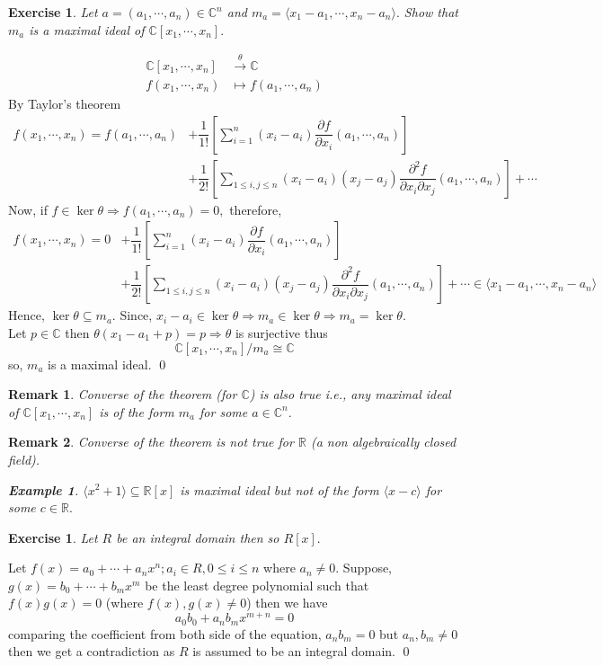 \documentclass[11pt]{amsart}
\newtheorem{ex}[theorem]{Exercise}
\newtheorem*{eg*}{Example}
\newtheorem*{remark*}{Remark}
\newcommand{\CC}{\mathbb C}
\newcommand{\RR}{\mathbb R}
\newcommand{\gen}[1]{\langle#1\rangle}
\begin{document}
\begin{ex}
Let $a=(a_1,\cdots ,a_n)\in {\CC}^n$ and $m_a=\langle x_1-a_1,\cdots ,x_n-a_n\rangle.$ Show that $m_a$ is a maximal ideal of ${\CC}[x_1,\cdots ,x_n].$
\end{ex}
\proof \begin{align*}
{\CC}[x_1,\cdots ,x_n]&\stackrel{\theta}{\longrightarrow} {\CC}\\
f(x_1,\cdots ,x_n)&\mapsto f(a_1,\cdots ,a_n)
\end{align*}
By Taylor's theorem \begin{align*}
f(x_1,\cdots ,x_n)=f(a_1,\cdots ,a_n)&+\dfrac{1}{1!}\left[\displaystyle\sum_{i=1}^n (x_i-a_i)\dfrac{\partial f}{\partial x_i}(a_1,\cdots ,a_n)\right]\\
&+\dfrac{1}{2!}\left[\displaystyle\sum_{1\leq i,j\leq n} (x_i-a_i)(x_j-a_j)\dfrac{\partial^2 f}{\partial x_i\partial x_j}(a_1,\cdots ,a_n)\right]+\cdots
\end{align*}
Now, if $f\in \ker \theta \Rightarrow f(a_1,\cdots ,a_n)=0,$ therefore,  \begin{align*}
f(x_1,\cdots ,x_n)=0&+\dfrac{1}{1!}\left[\displaystyle\sum_{i=1}^n (x_i-a_i)\dfrac{\partial f}{\partial x_i}(a_1,\cdots ,a_n)\right]\\
&+\dfrac{1}{2!}\left[\displaystyle\sum_{1\leq i,j\leq n} (x_i-a_i)(x_j-a_j)\dfrac{\partial^2 f}{\partial x_i\partial x_j}(a_1,\cdots ,a_n)\right]+\cdots \in \gen{x_1-a_1,\cdots ,x_n-a_n}
\end{align*}
Hence, $\ker \theta\subseteq m_a.$ Since, $x_i-a_i\in \ker \theta \Rightarrow m_a\in \ker \theta \Rightarrow m_a=\ker \theta.$\\ Let $p\in {\CC}$ then $\theta(x_1-a_1+p)=p \Rightarrow \theta $ is surjective thus $${\CC}[x_1,\cdots ,x_n]/m_a\cong {\CC}$$ so, $m_a$ is a maximal ideal. \qed
\begin{remark*}
Converse of the theorem (for ${\CC}$) is also true i.e., any maximal ideal of ${\CC}[x_1,\cdots ,x_n]$ is of the form $m_a$ for some $a\in {\CC}^n.$
\end{remark*}
\begin{remark*}
Converse of the theorem is not true for ${\RR}$ (a non algebraically closed field).
\begin{eg*}
$\gen{x^2+1}\subseteq {\RR}[x]$ is maximal ideal but not of the form $\gen{x-c}$ for some $c\in {\RR}.$
\end{eg*}
\end{remark*}

\begin{ex}
Let $R$ be an integral domain then so $R[x].$
\end{ex}
\proof Let $f(x)=a_0+\cdots +a_nx^n;a_i\in R,0\leq i\leq n$ where $a_n\neq 0.$ Suppose, $g(x)=b_0+\cdots +b_mx^m$ be the least degree polynomial such that  
$f(x)g(x)=0$ (where $f(x),g(x)\neq 0$) then we have $$a_0b_0+a_nb_mx^{m+n}=0$$ comparing the coefficient from both side of the equation, $a_nb_m=0$ but $a_n,b_m\neq 0$ then we get a contradiction as $R$ is assumed to be an integral domain. \qed
\end{document}
